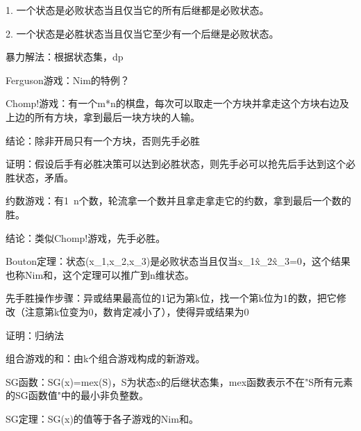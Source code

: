 1. 一个状态是必败状态当且仅当它的所有后继都是必败状态。

2. 一个状态是必胜状态当且仅当它至少有一个后继是必败状态。


暴力解法：根据状态集，dp

Ferguson游戏：Nim的特例？

Chomp!游戏：有一个m*n的棋盘，每次可以取走一个方块并拿走这个方块右边及上边的所有方块，拿到最后一块方块的人输。

结论：除非开局只有一个方块，否则先手必胜

证明：假设后手有必胜决策可以达到必胜状态，则先手必可以抢先后手达到这个必胜状态，矛盾。

约数游戏：有1~n个数，轮流拿一个数并且拿走拿走它的约数，拿到最后一个数的胜。

结论：类似Chomp!游戏，先手必胜。

Bouton定理：状态(x\_1,x\_2,x\_3)是必败状态当且仅当x\_1\^x\_2\^x\_3=0，这个结果也称Nim和，这个定理可以推广到n维状态。

先手胜操作步骤：异或结果最高位的1记为第k位，找一个第k位为1的数，把它修改（注意第k位变为0，数肯定减小了），使得异或结果为0

证明：归纳法

组合游戏的和：由k个组合游戏构成的新游戏。

SG函数：SG(x)=mex(S)，S为状态x的后继状态集，mex函数表示不在"S所有元素的SG函数值"中的最小非负整数。

SG定理：SG(x)的值等于各子游戏的Nim和。